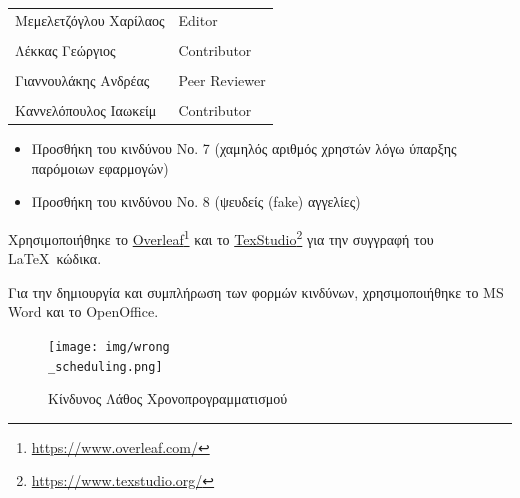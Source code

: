 \documentclass{../ol-softwaremanual}
\newcommand{\doclink}[2]{\href{#1}{#2}\footnote{\url{#1}}}
\begin{document}
	
	\vspace{20pt}
	
	\begin{table}[htbp!]
		\begin{tabular}{ll}
			Μεμελετζόγλου Χαρίλαος & \en Editor \\
			\\ Λέκκας Γεώργιος      &   \en  Contributor \\
			\\ Γιαννουλάκης Ανδρέας & \en Peer Reviewer \\
			\\ Καννελόπουλος Ιαωκείμ & \en Contributor \\ 
		\end{tabular}
	\end{table}

	\vspace{10pt}

	\begin{itemize}
		\item Προσθήκη του κινδύνου Νο. 7 (χαμηλός αριθμός χρηστών λόγω ύπαρξης παρόμοιων εφαρμογών)
		\item Προσθήκη του κινδύνου Νο. 8 (ψευδείς \en (fake) \gr αγγελίες)
	\end{itemize}

	
	
	\vspace{20pt}
	
	
	\vspace{20pt}
	\flushleft
	Χρησιμοποιήθηκε το \en \doclink{https://www.overleaf.com/}{Overleaf} \gr και το \en \doclink{https://www.texstudio.org/}{TexStudio} \gr για την συγγραφή του \LaTeX\ κώδικα. \break
	
	Για την δημιουργία και συμπλήρωση των φορμών κινδύνων, χρησιμοποιήθηκε το \en MS Word \gr και το \en OpenOffice\gr.
	
	
	
	
	\newpage 
	
	
	\flushleft
	
	\begin{figure}[htbp!]
		\texttt{[image: img/wrong\\\_scheduling.png]}
		\caption{Κίνδυνος Λάθος Χρονοπρογραμματισμού}
	\end{figure}
	
\end{document}
